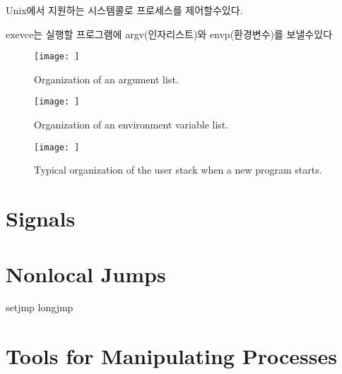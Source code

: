 Unix에서 지원하는 시스템콜로 프로세스를 제어할수있다.


exevce는 실행할 프로그램에 argv(인자리스트)와  envp(환경변수)를 보낼수있다

\begin{figure}[h!]
    \centering
    \texttt{[image: ]}
    \caption{Organization of an argument list.}
\end{figure}


\begin{figure}[h!]
    \centering
    \texttt{[image: ]}
    \caption{Organization of an environment variable list.}
\end{figure}

\begin{figure}[h!]
    \centering
    \texttt{[image: ]}
    \caption{Typical organization of the user stack when a new program starts.}
\end{figure}



\section{Signals}


\section{Nonlocal Jumps}

setjmp longjmp

\section{Tools for Manipulating Processes}
